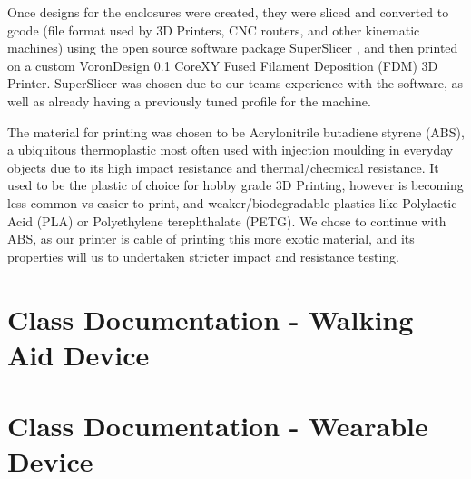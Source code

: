             Once designs for the enclosures were created, they were sliced and converted to gcode (file format used by 3D Printers, CNC routers, and other kinematic machines) using the open source software package SuperSlicer \cite{merill_2022}, and then printed on a custom VoronDesign 0.1 CoreXY Fused Filament Deposition (FDM) 3D Printer. SuperSlicer was chosen due to our teams experience with the software, as well as already having a previously tuned profile for the machine.

            The material for printing was chosen to be Acrylonitrile butadiene styrene (ABS), a ubiquitous thermoplastic most often used with injection moulding in everyday objects due to its high impact resistance and thermal/checmical resistance. It used to be the plastic of choice for hobby grade 3D Printing, however is becoming less common vs easier to print, and weaker/biodegradable plastics like Polylactic Acid (PLA) or Polyethylene terephthalate (PETG). We chose to continue with ABS, as our printer is cable of printing this more exotic material, and its properties will us to undertaken stricter impact and resistance testing.             
        
    \newpage

    \section{Class Documentation - Walking Aid Device}
    \label{sec:class_documentation_walk_aid}\mbox{}

        
        \newpage
        
        \newpage
        
        \newpage
        
        \newpage
        
        \newpage
        
        \newpage

    \section{Class Documentation - Wearable Device}
    \label{sec:class_documentation_wearable}\mbox{}

        
        \newpage
        
        \newpage
        
        \newpage
        
        \newpage
